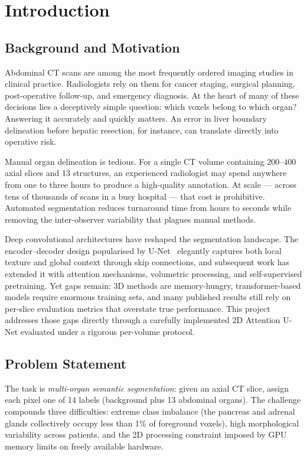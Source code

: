 \chapter{Introduction}
\label{chap:intro}

\section{Background and Motivation}

Abdominal CT scans are among the most frequently ordered imaging studies in clinical practice.
Radiologists rely on them for cancer staging, surgical planning, post-operative follow-up, and
emergency diagnosis. At the heart of many of these decisions lies a deceptively simple question:
which voxels belong to which organ? Answering it accurately and quickly matters. An error in
liver boundary delineation before hepatic resection, for instance, can translate directly into
operative risk.

Manual organ delineation is tedious. For a single CT volume containing $200$--$400$ axial slices
and 13 structures, an experienced radiologist may spend anywhere from one to three hours to produce
a high-quality annotation. At scale --- across tens of thousands of scans in a busy hospital ---
that cost is prohibitive. Automated segmentation reduces turnaround time from hours to seconds
while removing the inter-observer variability that plagues manual methods.

Deep convolutional architectures have reshaped the segmentation landscape. The encoder--decoder
design popularised by U-Net~\cite{ronneberger2015} elegantly captures both local texture and global
context through skip connections, and subsequent work has extended it with attention mechanisms,
volumetric processing, and self-supervised pretraining. Yet gaps remain: 3D methods are
memory-hungry, transformer-based models require enormous training sets, and many published results
still rely on per-slice evaluation metrics that overstate true performance. This project addresses
those gaps directly through a carefully implemented 2D Attention U-Net evaluated under a rigorous
per-volume protocol.

\section{Problem Statement}

The task is \emph{multi-organ semantic segmentation}: given an axial CT slice, assign each pixel
one of 14 labels (background plus 13 abdominal organs). The challenge compounds three
difficulties: extreme class imbalance (the pancreas and adrenal glands collectively occupy less
than 1\% of foreground voxels), high morphological variability across patients, and the 2D
processing constraint imposed by GPU memory limits on freely available hardware.

